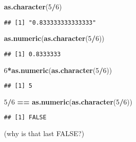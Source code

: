 \documentclass[8pt,ignorenonframetext,]{beamer}
\newenvironment{Shaded}{\begin{snugshade}}{\end{snugshade}}
\newcommand{\KeywordTok}[1]{\textcolor[rgb]{0.13,0.29,0.53}{\textbf{#1}}}
\newcommand{\DecValTok}[1]{\textcolor[rgb]{0.00,0.00,0.81}{#1}}
\newcommand{\StringTok}[1]{\textcolor[rgb]{0.31,0.60,0.02}{#1}}
\newcommand{\OperatorTok}[1]{\textcolor[rgb]{0.81,0.36,0.00}{\textbf{#1}}}
\newcommand{\NormalTok}[1]{#1}
\begin{document}
\begin{frame}[fragile]{}

\begin{Shaded}
\begin{Highlighting}[]
\KeywordTok{as.character}\NormalTok{(}\DecValTok{5}\OperatorTok{/}\DecValTok{6}\NormalTok{)}
\end{Highlighting}
\end{Shaded}

\begin{verbatim}
## [1] "0.833333333333333"
\end{verbatim}

\begin{Shaded}
\begin{Highlighting}[]
\KeywordTok{as.numeric}\NormalTok{(}\KeywordTok{as.character}\NormalTok{(}\DecValTok{5}\OperatorTok{/}\DecValTok{6}\NormalTok{))}
\end{Highlighting}
\end{Shaded}

\begin{verbatim}
## [1] 0.8333333
\end{verbatim}

\begin{Shaded}
\begin{Highlighting}[]
\DecValTok{6}\OperatorTok{*}\KeywordTok{as.numeric}\NormalTok{(}\KeywordTok{as.character}\NormalTok{(}\DecValTok{5}\OperatorTok{/}\DecValTok{6}\NormalTok{))}
\end{Highlighting}
\end{Shaded}

\begin{verbatim}
## [1] 5
\end{verbatim}

\begin{Shaded}
\begin{Highlighting}[]
\DecValTok{5}\OperatorTok{/}\DecValTok{6} \OperatorTok{==}\StringTok{ }\KeywordTok{as.numeric}\NormalTok{(}\KeywordTok{as.character}\NormalTok{(}\DecValTok{5}\OperatorTok{/}\DecValTok{6}\NormalTok{))}
\end{Highlighting}
\end{Shaded}

\begin{verbatim}
## [1] FALSE
\end{verbatim}

(why is that last FALSE?)

\end{frame}
\end{document}

